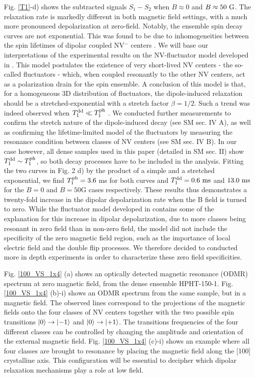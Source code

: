 \documentclass[preprintnumbers,amsmath,amssymb,superscriptaddress,twocolumn,showpacs]{revtex4-2}
\begin{document}
Fig. \ref{T1}-d) shows the subtracted signals $S_1-S_2$ when $B\approx 0$ and $B \approx 50\ \rm G$.
The relaxation rate is markedly different in both magnetic field settings, with a much more pronounced depolarization at zero-field.
Notably, the ensemble spin decay curves are not exponential. This was found to be due to inhomogeneities between the spin lifetimes of dipolar coupled NV$^-$ centers \citep{choi2017depolarization}.
We will base our interpretations of the experimental results on the NV-fluctuator model developed in \citep{choi2017depolarization}. This model postulates the existence of very short-lived NV centers - the so-called fluctuators - which, when coupled resonantly to the other NV centers, act as a polarization drain for the spin ensemble. A conclusion of this model is that, for a homogeneous 3D distribution of fluctuators, the dipole-induced relaxation should be a stretched-exponential with a stretch factor $\beta=1/2$. Such a trend was indeed observed when $T_1^{\rm dd} \ll T_1^{\rm ph}$ \cite{choi2017depolarization}. We conducted further measurements to confirm the stretch nature of the dipole-induced decay (see SM sec. IV A), as well as confirming the lifetime-limited model of the fluctuators by measuring the resonance condition between classes of NV centers (see SM sec. IV B).
In our case however, all dense samples used in this paper (detailed in SM sec. II) show $T_1^{\rm dd} \sim T_1^{\rm ph}$, so both decay processes have to be included in the analysis. Fitting the two curves in Fig. 2 d) by the product of a simple and a stretched exponential, we find $T_1^{\rm ph}=3.6$ ms for both curves and $T_1^{\rm dd}= 0.6\ \rm ms$ and $13.0\ \rm ms$ for the $B=0$ and $B=50$G cases respectively. These results thus demonstrates a twenty-fold increase in the dipolar depolarization rate when the B field is turned to zero.
While the fluctuator model developed in \citep{choi2017depolarization} contains some of the explanation for this increase in dipolar depolarization, due to more classes being resonant in zero field than in non-zero field, the model did not include the specificity of the zero magnetic field region, such as the importance of local electric field and the double flip processes. We therefore decided to conducted more in depth experiments in order to characterize these zero field specificities.

Fig. \ref{100_VS_1x4} (a) shows an optically detected magnetic resonance (ODMR) spectrum at zero magnetic field, from the dense ensemble HPHT-150-1.
Fig. \ref{100_VS_1x4} (b)-i) shows an ODMR spectrum from the same sample, but in a magnetic field. The observed lines correspond to the projections of the magnetic fields onto the four classes of NV centers together with the two possible spin transitions $\ket{0}\to\ket{-1}$ and $\ket{0}\to\ket{+1}$. The transitions frequencies of the four different classes can be controlled by changing the amplitude and orientation of the external magnetic field. Fig. \ref{100_VS_1x4} (c)-i) shows an example where all four classes are brought to resonance by placing the magnetic field along the [100] crystalline axis. 
This configuration will be essential to decipher which dipolar relaxation mechanisms play a role at low field. 
\end{document}
